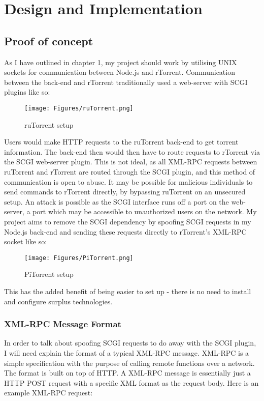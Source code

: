 \chapter{Design and Implementation} 

\label{Chapter3} 



\section{Proof of concept}
As I have outlined in chapter 1, my project should work by utilising UNIX sockets for communication between Node.js and rTorrent. Communication between the back-end and rTorrent traditionally used a web-server with SCGI plugins like so: 

\begin{figure}[h!]
  \centering
    \texttt{[image: Figures/ruTorrent.png]}
  \caption{ruTorrent setup}
\end{figure}

Users would make HTTP requests to the ruTorrent back-end to get torrent information. The back-end then would then have to route requests to rTorrent via the SCGI web-server plugin. This is not ideal, as all XML-RPC requests between ruTorrent and rTorrent are routed through the SCGI plugin, and this method of communication is open to abuse. It may be possible for malicious individuals to send commands to rTorrent directly, by bypassing ruTorrent on an unsecured setup. An attack is possible as the SCGI interface runs off a port on the web-server, a port which may be accessible to unauthorized users on the network. My project aims to remove the SCGI dependency by spoofing SCGI requests in my Node.js back-end and sending these requests directly to rTorrent's XML-RPC socket like so:

\begin{figure}[h!]
  \centering
    \texttt{[image: Figures/PiTorrent.png]}
  \caption{PiTorrent setup}
\end{figure}

This has the added benefit of being easier to set up - there is no need to install and configure surplus technologies.


\subsection{XML-RPC Message Format}
In order to talk about spoofing SCGI requests to do away with the SCGI plugin, I will need explain the format of a typical XML-RPC message. XML-RPC is a simple specification with the purpose of calling remote functions over a network. The format is built on top of HTTP. A XML-RPC message is essentially just a HTTP POST request with a specific XML format as the request body. Here is an example XML-RPC request:

